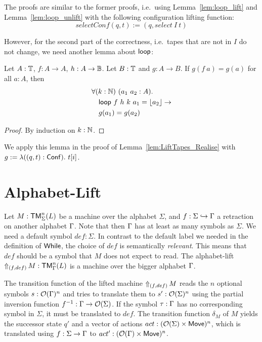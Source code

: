 The proofs are similar to the former proofs, i.e.\ using Lemma~\ref{lem:loop_lift} and Lemma~\ref{lem:loop_unlift} with the following configuration
lifting function:
\[
  selectConf(q,t) := (q, select~I~t)
\]

However, for the second part of the correctness, i.e.\ tapes that are not in $I$ do not change, we need another lemma about $\Loop$:

\begin{lemma}
  \label{lem:loop_map}
  Let $A:\Type$, $f : A \to A$, $h:A \to \Bool$.  Let $B:\Type$ and $g : A \to B$.  If $g(f~a)=g(a)$ for all $a:A$, then
  \begin{alignat*}{1}
    & \forall (k:\Nat)~(a_1~a_2 : A). \\
    & \quad \Loop~f~h~k~a_1 = \Some{a_2} \rightarrow \\
    & \quad g(a_1) = g(a_2)
  \end{alignat*}
\end{lemma}
\begin{proof}
  By induction on $k:\Nat$.
\end{proof}

We apply this lemma in the proof of Lemma~\ref{lem:LiftTapes_Realise} with $g := \lambda ((q,t):\Conf).~t[i]$.



\section{Alphabet-Lift}
\label{sec:sigma-Lift}
%

Let $M : \TM_\Sigma^n(L)$ be a machine over the alphabet $\Sigma$, and $f : \Sigma \hookrightarrow \Tau$ a retraction on another alphabet $\Tau$.
Note that then $\Tau$ has at least as many symbols as $\Sigma$.  We need a default symbol $def:\Sigma$.  In contrast to the default label we needed in
the definition of $\While$, the choice of $def$ is semantically \textit{relevant}.  This means that $def$ should be a symbol that $M$ does not expect
to read.  The alphabet-lift $\LiftAlphabet{M}{(f,def)} : \TM_\Tau^n(L)$ is a machine over the bigger alphabet $\Tau$.

The transition function of the lifted machine $\LiftAlphabet{M}{(f,def)}$ reads the $n$ optional symbols $s : \Option(\Tau)^n$ and tries to translate
them to $s': \Option(\Sigma)^n$ using the partial inversion function $f^{-1} : \Tau \to \Option(\Sigma)$.  If the symbol $\tau:\Tau$ has no
corresponding symbol in $\Sigma$, it must be translated to $def$.  The transition function $\delta_M$ of $M$ yields the successor state $q'$ and a
vector of actions $act: (\Option(\Sigma) \times \MS{Move})^n$, which is translated using $f:\Sigma\to\Tau$ to
$act' : (\Option(\Tau) \times \MS{Move})^n$.

